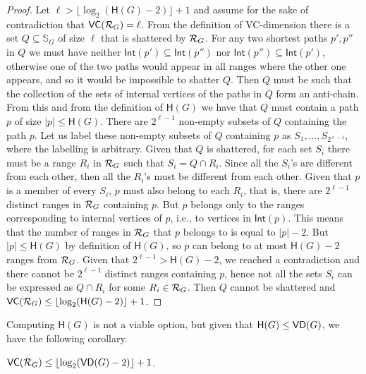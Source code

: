 \begin{proof}
Let $\ell>\lfloor\log_2(\mathsf{H}(G)-2)\rfloor+1$ and assume for the sake of contradiction
that $\mathsf{VC}(\mathcal{R}_G)=\ell$. From the definition of VC-dimension there is a set
$Q\subseteq\mathbb{S}_G$ of size $\ell$ that is shattered by $\mathcal{R}_G$.
For any two shortest paths $p',p''$ in $Q$ we must have neither
$\mathsf{Int}(p')\subseteq\mathsf{Int}(p'')$ nor
$\mathsf{Int}(p'')\subseteq\mathsf{Int}(p')$, otherwise one of the two paths
would appear in all ranges where the other one appears, and so it would be
impossible to shatter $Q$. Then $Q$ must be such that the collection of the
sets of internal vertices of the paths in $Q$ form an anti-chain. From this and
from the definition of $\mathsf{H}(G)$ we have that $Q$ must contain a path $p$ of
size $|p|\le\mathsf{H}(G)$. There are  $2^{\ell-1}$ non-empty subsets of
$Q$ containing the path $p$. Let us label these non-empty subsets of $Q$ containing $p$ as
$S_1,\dotsc,S_{2^{\ell-1}}$, where the labelling is arbitrary.
Given that $Q$ is shattered, for each set $S_i$ there must be a range $R_i$ in
$\mathcal{R}_G$ such that $S_i=Q\cap R_i$. Since all the $S_i$'s are
different from each other, then all the $R_i$'s must be different from each
other. Given that $p$ is a member of every $S_i$, $p$ must also belong to each
$R_i$, that is, there are $2^{\ell-1}$ distinct ranges in $\mathcal{R}_G$ containing
$p$. But $p$ belongs only to the ranges corresponding to internal vertices of
$p$, i.e., to vertices in $\mathsf{Int}(p)$. This means that the number of ranges
in $\mathcal{R}_G$ that $p$ belongs to is equal to $|p|-2$. But $|p|\le\mathsf{H}(G)$ by
definition of $\mathsf{H}(G)$, so $p$
can belong to at most $\mathsf{H}(G)-2$ ranges from $\mathcal{R}_G$. Given that
$2^{\ell-1}>\mathsf{H}(G)-2$, we reached a contradiction and there cannot be $2^{\ell-1}$
distinct ranges containing $p$, hence not all the sets $S_i$ can be expressed as
$Q\cap R_i$ for some $R_i\in\mathcal{R}_G$. Then $Q$ cannot be shattered and
$\mathsf{VC}(\mathcal{R}_G)\le\lfloor\log_2(\mathsf{H}(G)-2)\rfloor+1$.
\end{proof}

Computing $\mathsf{H}(G)$ is not a viable option, but given that
$\mathsf{H}(G)\le\mathsf{VD}(G)$, we have the following corollary.

\begin{corollary}\label{corol:vcdimuppbound}
  $\mathsf{VC}(\mathcal{R}_G)\le\lfloor\log_2(\mathsf{VD}(G)-2)\rfloor+1$.
\end{corollary}

